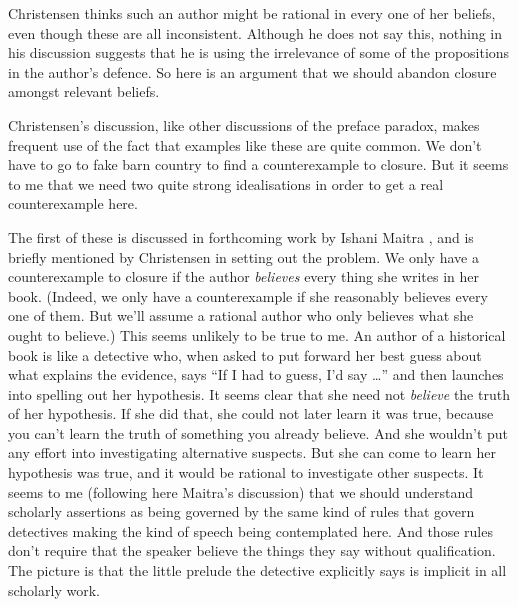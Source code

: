 \noindent Christensen thinks such an author might be rational in every one of her beliefs, even though these are all inconsistent. Although he does not say this, nothing in his discussion suggests that he is using the irrelevance of some of the propositions in the author's defence. So here is an argument that we should abandon closure amongst relevant beliefs.

Christensen's discussion, like other discussions of the preface paradox, makes frequent use of the fact that examples like these are quite common. We don't have to go to fake barn country to find a counterexample to closure. But it seems to me that we need two quite strong idealisations in order to get a real counterexample here.

The first of these is discussed in forthcoming work by Ishani Maitra \citep{MaitraANG}, and is briefly mentioned by Christensen in setting out the problem. We only have a counterexample to closure if the author \textit{believes} every thing she writes in her book. (Indeed, we only have a counterexample if she reasonably believes every one of them. But we'll assume a rational author who only believes what she ought to believe.) This seems unlikely to be true to me. An author of a historical book is like a detective who, when asked to put forward her best guess about what explains the evidence, says ``If I had to guess, I'd say {\dots}'' and then launches into spelling out her hypothesis. It seems clear that she need not \textit{believe} the truth of her hypothesis. If she did that, she could not later learn it was true, because you can't learn the truth of something you already believe. And she wouldn't put any effort into investigating alternative suspects. But she can come to learn her hypothesis was true, and it would be rational to investigate other suspects. It seems to me (following here Maitra's discussion) that we should understand scholarly assertions as being governed by the same kind of rules that govern detectives making the kind of speech being contemplated here. And those rules don't require that the speaker believe the things they say without qualification. The picture is that the little prelude the detective explicitly says is implicit in all scholarly work.

